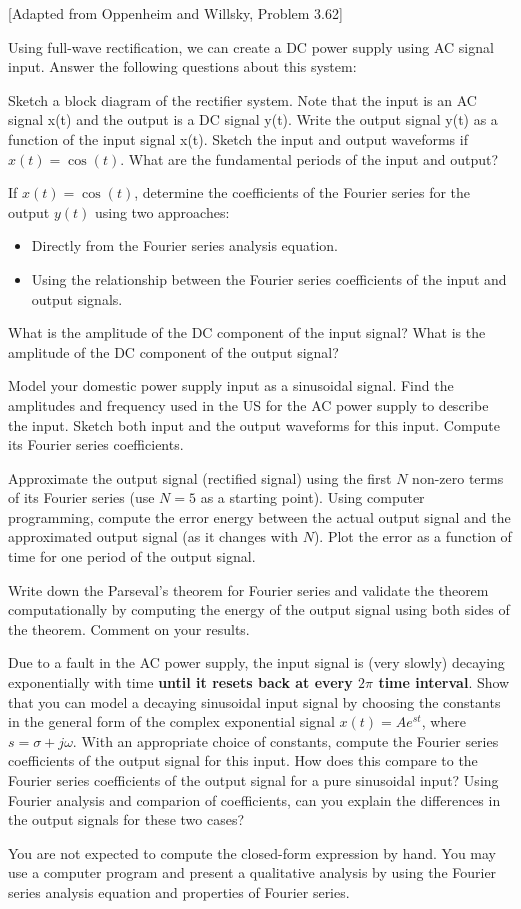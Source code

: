 \documentclass{ee102_pset}
\author{\rule{3cm}{0.4pt}} %
\begin{document}

[Adapted from Oppenheim and Willsky, Problem 3.62]

Using full-wave rectification, we can create a DC power supply using AC signal input. Answer the following questions about this system:

\problempart[5 points] Sketch a block diagram of the rectifier system. Note that the input is an AC signal x(t) and the output is a DC signal y(t).
\problempart[5 points] Write the output signal y(t) as a function of the input signal x(t).
\problempart[5 points] Sketch the input and output waveforms if $x(t) = \cos(t)$. What are the fundamental periods of the input and output?

\problempart[20 points] If $x(t) = \cos(t)$, determine the coefficients of the Fourier series for the output $y(t)$ using two approaches: 
\begin{itemize}
\item Directly from the Fourier series analysis equation.
\item Using the relationship between the Fourier series coefficients of the input and output signals.
\end{itemize}

\problempart[10 points] What is the amplitude of the DC component of the input signal? What is the amplitude of the DC component of the output signal?

\problempart[10 points] Model your domestic power supply input as a sinusoidal signal. Find the amplitudes and frequency used in the US for the AC power supply to describe the input. Sketch both input and the output waveforms for this input. Compute its Fourier series coefficients.

\problempart[20 points] Approximate the output signal (rectified signal) using the first $N$ non-zero terms of its Fourier series (use $N = 5$ as a starting point). Using computer programming, compute the error energy between the actual output signal and the approximated output signal (as it changes with $N$). Plot the error as a function of time for one period of the output signal.

\problempart[15 points] Write down the Parseval's theorem for Fourier series and validate the theorem computationally by computing the energy of the output signal using both sides of the theorem. Comment on your results.

\problempart[10 points] Due to a fault in the AC power supply, the input signal is (very slowly) decaying exponentially with time \textbf{until it resets back at every $2\pi$ time interval}. Show that you can model a decaying sinusoidal input signal by choosing the constants in the general form of the complex exponential signal $x(t) = Ae^{st}$, where $s = \sigma + j\omega$. With an appropriate choice of constants, compute the Fourier series coefficients of the output signal for this input. How does this compare to the Fourier series coefficients of the output signal for a pure sinusoidal input? Using Fourier analysis and comparion of coefficients, can you explain the differences in the output signals for these two cases?


{\color{blue} You are not expected to compute the closed-form expression by hand. You may use a computer program and present a qualitative analysis by using the Fourier series analysis equation and properties of Fourier series.}
\end{document}
